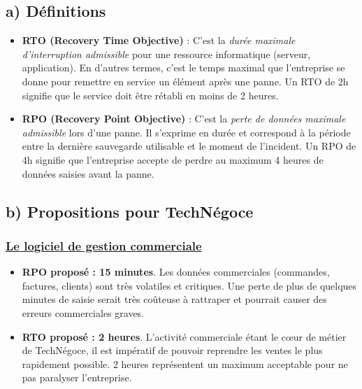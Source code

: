 \documentclass[a4paper,10pt]{article}
\newcommand{\notion}[1]{\textbf{\textcolor{mainBlue}{#1}}}
\newcommand{\important}[1]{\textit{\textcolor{alertRed}{#1}}}
\newcommand{\definition}[1]{\textbf{\textcolor{softTeal}{#1}}}
\begin{document}
\begin{tcolorbox}[title=3) RTO et RPO]
    \subsection*{a) Définitions}
    \begin{itemize}[leftmargin=*]
        \item \definition{RTO (Recovery Time Objective)} : C'est la \important{durée maximale d'interruption admissible} pour une ressource informatique (serveur, application). En d'autres termes, c'est le temps maximal que l'entreprise se donne pour remettre en service un élément après une panne. Un RTO de 2h signifie que le service doit être rétabli en moins de 2 heures.
        
        \item \definition{RPO (Recovery Point Objective)} : C'est la \important{perte de données maximale admissible} lors d'une panne. Il s'exprime en durée et correspond à la période entre la dernière sauvegarde utilisable et le moment de l'incident. Un RPO de 4h signifie que l'entreprise accepte de perdre au maximum 4 heures de données saisies avant la panne.
    \end{itemize}

    \subsection*{b) Propositions pour TechNégoce}
    \subsubsection*{\underline{Le logiciel de gestion commerciale}}
    \begin{itemize}[leftmargin=*]
        \item \notion{RPO proposé : 15 minutes}. Les données commerciales (commandes, factures, clients) sont très volatiles et critiques. Une perte de plus de quelques minutes de saisie serait très coûteuse à rattraper et pourrait causer des erreurs commerciales graves.
        \item \notion{RTO proposé : 2 heures}. L'activité commerciale étant le cœur de métier de TechNégoce, il est impératif de pouvoir reprendre les ventes le plus rapidement possible. 2 heures représentent un maximum acceptable pour ne pas paralyser l'entreprise.
    \end{itemize}


\end{tcolorbox}
\end{document}
